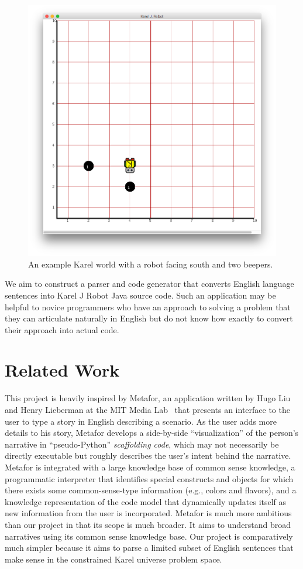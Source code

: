 \documentclass[11pt]{article}
\begin{document}
\begin{figure}[ht]
\centering
\includegraphics[width=\columnwidth]{karel-ex.png}
\caption{An example Karel world with a robot facing south and two beepers.}
\label{fig:karel-ex}
\end{figure}

We aim to construct a parser and code generator that converts English language sentences into Karel
J Robot Java source code. Such an application may be helpful to novice programmers who have an
approach to solving a problem that they can articulate naturally in English but do not know how
exactly to convert their approach into actual code.

\section{Related Work}
This project is heavily inspired by Metafor, an application written by Hugo Liu and Henry Lieberman
at the MIT Media Lab~ that presents an interface to the user to type a
story in English describing a scenario. As the user adds more details to his story, Metafor
develops a side-by-side ``visualization'' of the person's narrative in ``pseudo-Python''
\emph{scaffolding code}, which may not necessarily be directly executable but roughly describes the
user's intent behind the narrative. Metafor is integrated with a large knowledge base of common
sense knowledge, a programmatic interpreter that identifies special constructs and objects for
which there exists some common-sense-type information (e.g., colors and flavors), and a knowledge
representation of the code model that dynamically updates itself as new information from the user
is incorporated. Metafor is much more ambitious than our project in that its scope is much broader.
It aims to understand broad narratives using its common sense knowledge base. Our project is
comparatively much simpler because it aims to parse a limited subset of English sentences that make
sense in the constrained Karel universe problem space.
\end{document}
